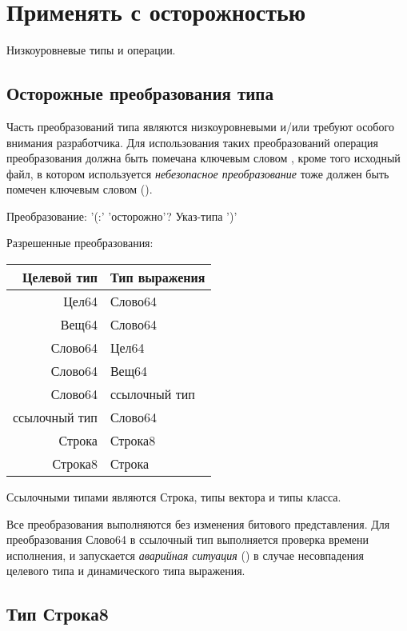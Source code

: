 \hypertarget{unsafe}{%
\section{Применять с осторожностью}\label{unsafe:chapter}}

Низкоуровневые типы и операции.

\hypertarget{unsafe-conversions}{%
\subsection{Осторожные преобразования типа}\label{unsafe:conversions}}

Часть преобразований типа являются низкоуровневыми и/или требуют особого внимания разработчика. 
Для использования таких преобразований операция преобразования должна быть помечана ключевым словом , 
кроме того исходный файл, в котором используется \emph{небезопасное преобразование} тоже должен быть помечен  ключевым словом  ().

\begin{Grammar}
Преобразование: '(:' 'осторожно'? Указ-типа ')'
\end{Grammar}   

Разрешенные преобразования:

\smallskip
\begin{tabular}[c]{r|l}
\textbf{Целевой тип} & \textbf{Тип выражения}  \\ 
\hline
Цел64 & Слово64  \\
Вещ64 & Слово64  \\
Слово64 & Цел64  \\
Слово64 & Вещ64  \\
Слово64 & ссылочный тип  \\
ссылочный тип & Слово64 \\
Строка & Строка8  \\
Строка8 & Строка  \\
\hline
\end{tabular}

\bigskip
Ссылочными типами являются Строка, типы вектора и типы класса.

Все преобразования выполняются  без изменения битового представления. 
Для преобразования Слово64 в ссылочный тип выполняется проверка времени исполнения, 
и запускается \emph{аварийная ситуация} () в случае несовпадения целевого типа и динамического типа выражения.

\hypertarget{type-string8}{%
\subsection{Тип Строка8}\label{unsafe:type-string8}}

